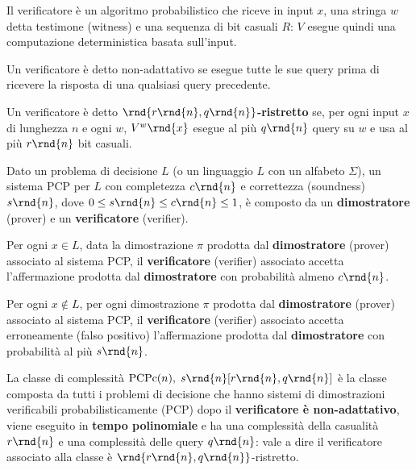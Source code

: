 \documentclass[\main/main.tex]{subfiles}
\begin{document}
\begin{multicols}{2}
\begin{definition}
    Il verificatore è un algoritmo probabilistico che riceve in input \(x\), una stringa \(w\) detta testimone (witness) e una sequenza di bit casuali \(R\): \(V\) esegue quindi una computazione deterministica basata sull'input.
\end{definition}
\begin{property}
    Un verificatore è detto non-adattativo se esegue tutte le sue query prima di ricevere la risposta di una qualsiasi query precedente.
\end{property}
\begin{property}
    Un verificatore è detto \textbf{\(\rnd{r\rnd{n}, q\rnd{n}}\)-ristretto} se, per ogni input \(x\) di lunghezza \(n\) e ogni \(w\), \(V^w\rnd{x}\) esegue al più \(q\rnd{n}\) query su \(w\) e usa al più \(r\rnd{n}\) bit casuali.
\end{property}
\begin{definition}
    Dato un problema di decisione \(L\) (o un linguaggio \(L\) con un alfabeto \(\Sigma\)), un sistema PCP per \(L\) con completezza \(c\rnd{n}\) e correttezza (soundness) \(s\rnd{n}\), dove \(0 \leq s\rnd{n} \leq c\rnd{n} \leq 1\), è composto da un \textbf{dimostratore} (prover) e un \textbf{verificatore} (verifier).
\end{definition}
\begin{property}[Completezza]
    Per ogni \(x \in L\), data la dimostrazione \(\pi\) prodotta dal \textbf{dimostratore} (prover) associato al sistema PCP, il \textbf{verificatore} (verifier) associato accetta l'affermazione prodotta dal \textbf{dimostratore} con probabilità almeno \(c\rnd{n}\).
\end{property}
\begin{property}
    Per ogni \(x \not\in L\), per ogni dimostrazione \(\pi\) prodotta dal \textbf{dimostratore} (prover) associato al sistema PCP, il \textbf{verificatore} (verifier) associato accetta erroneamente (falso positivo) l'affermazione prodotta dal \textbf{dimostratore} con probabilità al più \(s\rnd{n}\).
\end{property}
\begin{definition}
    La classe di complessità \(\operatorname{PCPc}(n),\; s\rnd{n}[r\rnd{n}, q\rnd{n}]\) è la classe composta da tutti i problemi di decisione che hanno sistemi di dimostrazioni verificabili probabilisticamente (PCP) dopo il \textbf{verificatore è non-adattativo}, viene eseguito in \textbf{tempo polinomiale} e ha una complessità della casualità \(r\rnd{n}\) e una complessità delle query \(q\rnd{n}\): vale a dire il verificatore associato alla classe è \(\rnd{r\rnd{n}, q\rnd{n}}\)-ristretto.
\end{definition}
\end{multicols}
\end{document}
